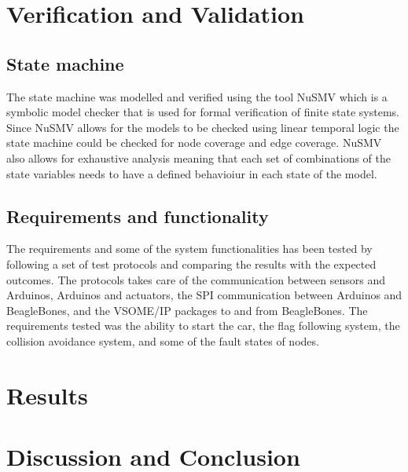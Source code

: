 \documentclass[11pt, titlepage]{article} %
\begin{document}


\clearpage
\section{Verification and Validation}

\subsection{State machine}
The state machine was modelled and verified using the tool NuSMV which is a symbolic model checker that is used for formal verification of finite state systems. Since NuSMV allows for the models to be checked using linear temporal logic the state machine could be checked for node coverage and edge coverage. NuSMV also allows for exhaustive analysis meaning that each set of combinations of the state variables needs to have a defined behavioiur in each state of the model.

\subsection{Requirements and functionality}
The requirements and some of the system functionalities has been tested by following a set of test protocols and comparing the results with the expected outcomes. The protocols takes care of the communication between sensors and Arduinos, Arduinos and actuators, the SPI communication between Arduinos and BeagleBones, and the VSOME/IP packages to and from BeagleBones. The requirements tested was the ability to start the car, the flag following system, the collision avoidance system, and some of the fault states of nodes.

\clearpage
\section{Results}

\clearpage
\section{Discussion and Conclusion}
\end{document}

